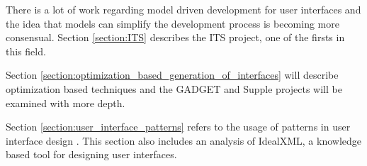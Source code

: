There is a lot of work regarding model driven development for user interfaces and the idea that models can simplify the development process is becoming more consensual. Section \ref{section:ITS} describes the ITS project, one of the firsts in this field. 

Section \ref{section:optimization_based_generation_of_interfaces} will describe optimization based techniques and the GADGET and Supple projects will be examined with more depth.

Section \ref{section:user_interface_patterns} refers to the usage of patterns in user interface design . This section also includes an analysis of IdealXML, a knowledge based tool for designing user interfaces.



